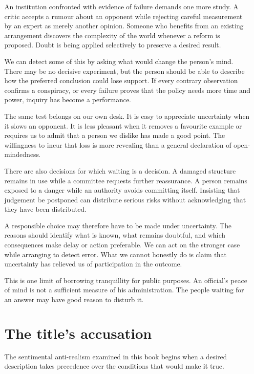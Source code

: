 \documentclass[12pt,a4paper]{book}
\begin{document}
An institution confronted with evidence of failure demands one more study. A critic accepts a rumour about an opponent while rejecting careful measurement by an expert as merely another opinion. Someone who benefits from an existing arrangement discovers the complexity of the world whenever a reform is proposed. Doubt is being applied selectively to preserve a desired result.

We can detect some of this by asking what would change the person's mind. There may be no decisive experiment, but the person should be able to describe how the preferred conclusion could lose support. If every contrary observation confirms a conspiracy, or every failure proves that the policy needs more time and power, inquiry has become a performance.

The same test belongs on our own desk. It is easy to appreciate uncertainty when it slows an opponent. It is less pleasant when it removes a favourite example or requires us to admit that a person we dislike has made a good point. The willingness to incur that loss is more revealing than a general declaration of open-mindedness.

There are also decisions for which waiting is a decision. A damaged structure remains in use while a committee requests further reassurance. A person remains exposed to a danger while an authority avoids committing itself. Insisting that judgement be postponed can distribute serious risks without acknowledging that they have been distributed.

A responsible choice may therefore have to be made under uncertainty. The reasons should identify what is known, what remains doubtful, and which consequences make delay or action preferable. We can act on the stronger case while arranging to detect error. What we cannot honestly do is claim that uncertainty has relieved us of participation in the outcome.

This is one limit of borrowing tranquillity for public purposes. An official's peace of mind is not a sufficient measure of his administration. The people waiting for an answer may have good reason to disturb it.

\section*{The title's accusation}

The sentimental anti-realism examined in this book begins when a desired description takes precedence over the conditions that would make it true.
\end{document}
